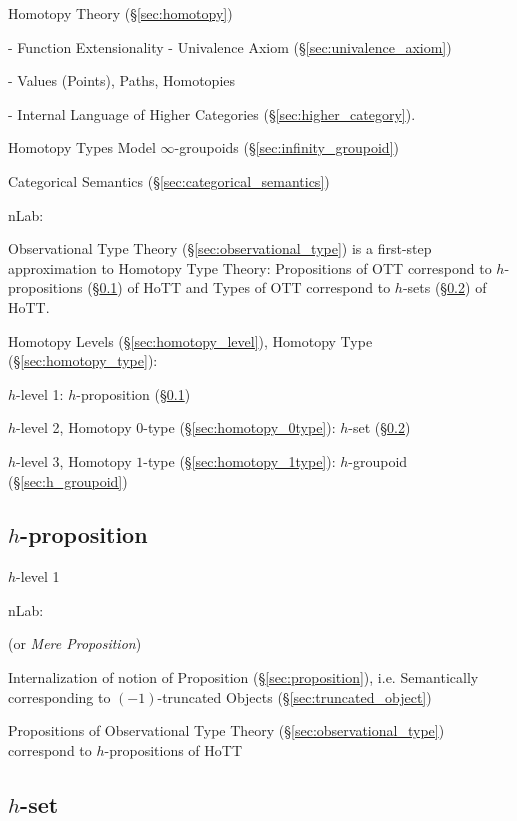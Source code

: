 Homotopy Theory (\S\ref{sec:homotopy})

- Function Extensionality
- Univalence Axiom (\S\ref{sec:univalence_axiom})

- Values (Points), Paths, Homotopies

- Internal Language of Higher Categories
(\S\ref{sec:higher_category}).

Homotopy Types Model $\infty$-groupoids
(\S\ref{sec:infinity_groupoid})

Categorical Semantics (\S\ref{sec:categorical_semantics})

nLab:

Observational Type Theory (\S\ref{sec:observational_type}) is a
first-step approximation to Homotopy Type Theory: Propositions of OTT
correspond to $h$-propositions (\S\ref{sec:h_proposition}) of HoTT and
Types of OTT correspond to $h$-sets (\S\ref{sec:h_set}) of HoTT.

Homotopy Levels (\S\ref{sec:homotopy_level}), Homotopy Type
(\S\ref{sec:homotopy_type}):

$h$-level 1: $h$-proposition (\S\ref{sec:h_proposition})

$h$-level 2, Homotopy $0$-type (\S\ref{sec:homotopy_0type}): $h$-set
(\S\ref{sec:h_set})

$h$-level 3, Homotopy $1$-type (\S\ref{sec:homotopy_1type}):
$h$-groupoid (\S\ref{sec:h_groupoid})



\subsection{$h$-proposition}\label{sec:h_proposition}

$h$-level 1

nLab:

(or \emph{Mere Proposition})

Internalization of notion of Proposition (\S\ref{sec:proposition}),
i.e. Semantically corresponding to $(-1)$-truncated Objects
(\S\ref{sec:truncated_object})

Propositions of Observational Type Theory
(\S\ref{sec:observational_type}) correspond to $h$-propositions of HoTT



\subsection{$h$-set}\label{sec:h_set}

